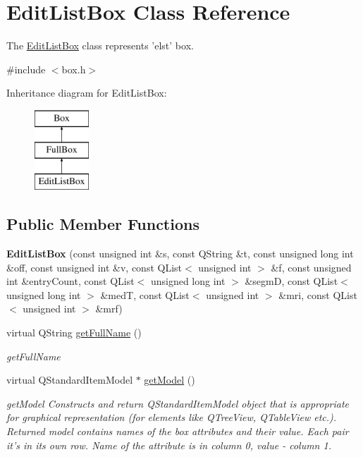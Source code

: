 \hypertarget{class_edit_list_box}{\section{Edit\-List\-Box Class Reference}
\label{class_edit_list_box}
}


The \hyperlink{class_edit_list_box}{Edit\-List\-Box} class represents 'elst' box.  




{\ttfamily \#include $<$box.\-h$>$}

Inheritance diagram for Edit\-List\-Box\-:\begin{figure}[H]
\begin{center}
\leavevmode
\includegraphics[height=3.000000cm]{class_edit_list_box}
\end{center}
\end{figure}
\subsection*{Public Member Functions}
\begin{DoxyCompactItemize}
\item 
\hypertarget{class_edit_list_box_a121e8e60e0f173e0148e01ad5992da1f}{{\bfseries Edit\-List\-Box} (const unsigned int \&s, const Q\-String \&t, const unsigned long int \&off, const unsigned int \&v, const Q\-List$<$ unsigned int $>$ \&f, const unsigned int \&entry\-Count, const Q\-List$<$ unsigned long int $>$ \&segm\-D, const Q\-List$<$ unsigned long int $>$ \&med\-T, const Q\-List$<$ unsigned int $>$ \&mri, const Q\-List$<$ unsigned int $>$ \&mrf)}\label{class_edit_list_box_a121e8e60e0f173e0148e01ad5992da1f}

\item 
virtual Q\-String \hyperlink{class_edit_list_box_a305003416ec092738d06298aaffbb47d}{get\-Full\-Name} ()
\begin{DoxyCompactList}\small\item\em get\-Full\-Name \end{DoxyCompactList}\item 
virtual Q\-Standard\-Item\-Model $\ast$ \hyperlink{class_edit_list_box_ab9a8848b0789b08e700447c3a279fcb4}{get\-Model} ()
\begin{DoxyCompactList}\small\item\em get\-Model Constructs and return Q\-Standard\-Item\-Model object that is appropriate for graphical representation (for elements like Q\-Tree\-View, Q\-Table\-View etc.). Returned model contains names of the box attributes and their value. Each pair it's in its own row. Name of the attribute is in column 0, value -\/ column 1. \end{DoxyCompactList}\end{DoxyCompactItemize}
